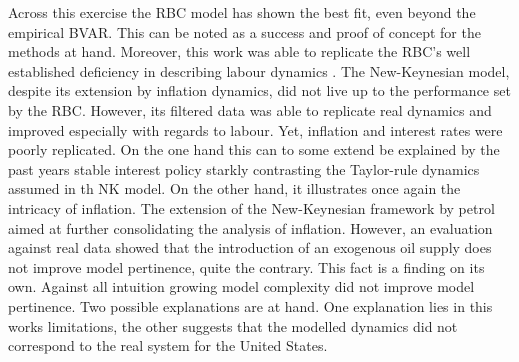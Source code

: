 \documentclass[12pt,a4paper,english]{article} %
\begin{document}
	Across this exercise the RBC model has shown the best fit, even beyond the empirical BVAR. This can be noted as a success and proof of concept for the methods at hand. Moreover, this work was able to replicate the RBC's well established deficiency in describing labour dynamics \cite{christiano_current_1992}. 
	The New-Keynesian model, despite its extension by inflation dynamics, did not live up to the performance set by the RBC. However, its filtered data was able to replicate real dynamics and improved especially with regards to labour. Yet, inflation and interest rates were poorly replicated. On the one hand this can to some extend be explained by the past years stable interest policy starkly contrasting the Taylor-rule dynamics assumed in th NK model. On the other hand, it illustrates once again the intricacy of inflation. 
	The extension of the New-Keynesian framework by petrol aimed at further consolidating the analysis of inflation. However, an evaluation against real data showed that the introduction of an exogenous oil supply does not improve model pertinence, quite the contrary. This fact is a finding on its own. Against all intuition growing model complexity did not improve model pertinence. Two possible explanations are at hand. One explanation lies in this works limitations, the other suggests that the modelled dynamics did not correspond to the real system for the United States. 
	
\end{document}
